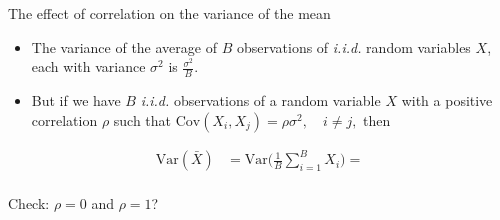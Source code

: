 \documentclass[10pt,ignorenonframetext,]{beamer}
\begin{document}
\begin{frame}

\begin{block}{The effect of correlation on the variance of the mean}

\vspace{3mm}

\begin{itemize}
\item
  The variance of the average of \(B\) observations of \emph{i.i.d.}
  random variables \(X\), each with variance \(\sigma^2\) is
  \(\frac{\sigma^2}{B}\).
\item
  But if we have \(B\) \emph{i.i.d.} observations of a random variable
  \(X\) with a positive correlation \(\rho\) such that
  \(\text{Cov}(X_i, X_j) = \rho \sigma^2, \quad i \neq j,\) then
\end{itemize}

\vspace{-3mm}

\[ \begin{aligned} \text{Var}(\bar{X}) &= \text{Var}\Big( \frac{1}{B}\sum_{i=1}^B X_i \Big) =\\
\end{aligned}\]

\vspace{35mm}

\vspace{1mm}

Check: \(\rho=0\) and \(\rho=1\)?

\end{block}

\end{frame}
\end{document}
